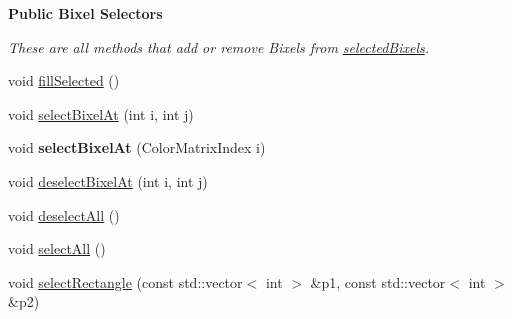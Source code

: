 \begin{Indent}{\bf Public Bixel Selectors}\par
{\em These are all methods that add or remove Bixels from \hyperlink{classGLWidget_ab07a9ee710f42da54d0158cbdedf3674}{selected\-Bixels}. }\begin{DoxyCompactItemize}
\item 
void \hyperlink{classGLWidget_a1acd74645ffbe6bc071365c2bbd176ba}{fill\-Selected} ()
\item 
void \hyperlink{classGLWidget_ac41fdd4181036c79f4bdf688045155b3}{select\-Bixel\-At} (int i, int j)
\item 
\hypertarget{classGLWidget_a75bca3161b8929b5190fa066cc14cc21}{void {\bfseries select\-Bixel\-At} (Color\-Matrix\-Index i)}\label{classGLWidget_a75bca3161b8929b5190fa066cc14cc21}

\item 
void \hyperlink{classGLWidget_a9ecf9af9846dacfa9cbf17cecc478145}{deselect\-Bixel\-At} (int i, int j)
\item 
void \hyperlink{classGLWidget_aa17c9adb76b61f1f0c4a285f538ce80d}{deselect\-All} ()
\item 
void \hyperlink{classGLWidget_abe918fd89a3f4c4f3d8864efee282610}{select\-All} ()
\item 
void \hyperlink{classGLWidget_a0f0089107cb0fbe89b337dfc01384e28}{select\-Rectangle} (const std\-::vector$<$ int $>$ \&p1, const std\-::vector$<$ int $>$ \&p2)
\end{DoxyCompactItemize}
\end{Indent}
